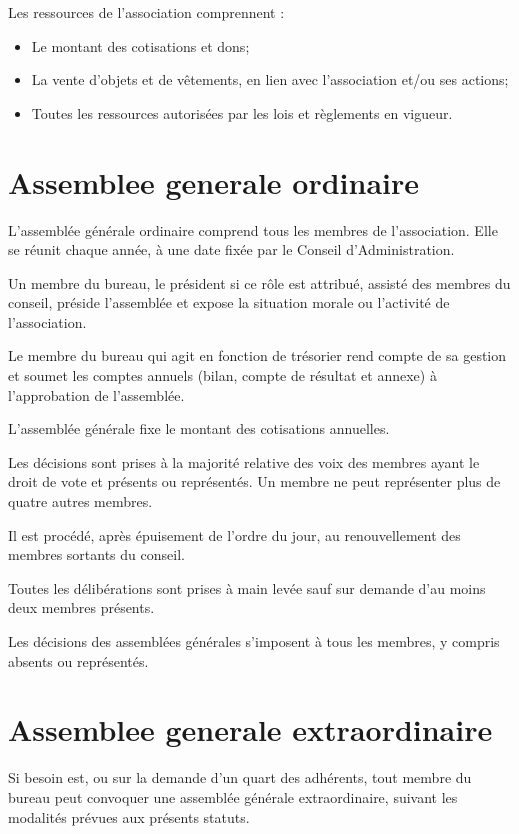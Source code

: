\documentclass[11 pt]{article}
\begin{document}
Les ressources de l'association comprennent :

\begin{itemize}
\item Le montant des cotisations et dons;
\item La vente d'objets et de vêtements, en lien avec l'association
  et/ou ses actions;
\item Toutes les ressources autorisées par les lois et règlements en
  vigueur.
\end{itemize}


\section{Assemblee generale ordinaire}

L'assemblée générale ordinaire comprend tous les membres de
l'association. Elle se réunit chaque année, à une date fixée par le
Conseil d'Administration.

Un membre du bureau, le président si ce rôle est attribué, assisté des
membres du conseil, préside l'assemblée et expose la situation morale
ou l’activité de l'association.

Le membre du bureau qui agit en fonction de trésorier rend compte de
sa gestion et soumet les comptes annuels (bilan, compte de résultat et
annexe) à l'approbation de l'assemblée.

L’assemblée générale fixe le montant des cotisations annuelles.

Les décisions sont prises à la majorité relative des voix des membres
ayant le droit de vote et présents ou représentés. Un membre ne peut
représenter plus de quatre autres membres.

Il est procédé, après épuisement de l'ordre du jour, au renouvellement
des membres sortants du conseil.

Toutes les délibérations sont prises à main levée sauf sur demande
d'au moins deux membres présents.

Les décisions des assemblées générales s’imposent à tous les membres,
y compris absents ou représentés.


\section{Assemblee generale extraordinaire}

Si besoin est, ou sur la demande d'un quart des adhérents, tout membre
du bureau peut convoquer une assemblée générale extraordinaire,
suivant les modalités prévues aux présents statuts.
\end{document}
